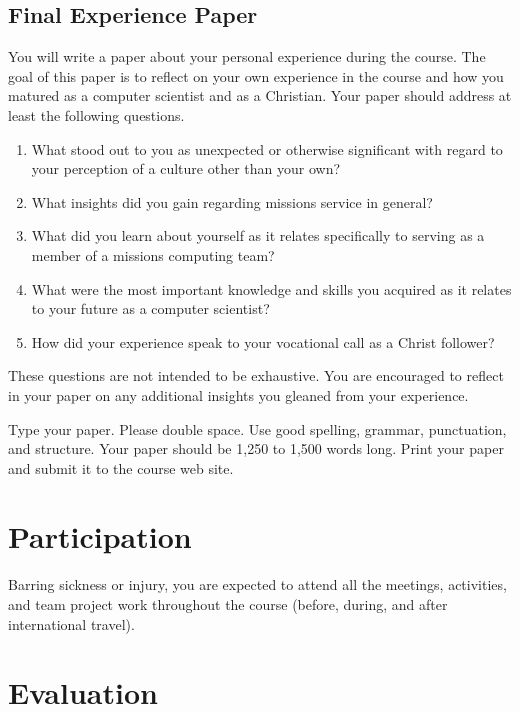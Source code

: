 \documentclass[11pt]{article}
\begin{document}
\subsection{Final Experience Paper}

You will write a paper about your personal experience during the course.
The goal of this paper is to reflect on your own experience in the course
and how you matured as a computer scientist and as a Christian.
Your paper should address at least the following questions.
\begin{enumerate}
\item
  What stood out to you as unexpected or otherwise significant
  with regard to your perception of a culture other than your own?
\item
  What insights did you gain regarding missions service in general?
\item
  What did you learn about yourself
  as it relates specifically to serving as a member of a missions computing team?
\item
  What were the most important knowledge and skills you acquired
  as it relates to your future as a computer scientist?
\item
  How did your experience speak to your vocational call as a Christ follower?
\end{enumerate}
These questions are not intended to be exhaustive.
You are encouraged to reflect in your paper
on any additional insights you gleaned from your experience.

Type your paper.
Please double space.
Use good spelling, grammar, punctuation, and structure.
Your paper should be 1,250 to 1,500 words long.
Print your paper and submit it to the course web site.

\section{Participation}

Barring sickness or injury, you are expected
to attend all the meetings, activities, and team project work
throughout the course
(before, during, and after international travel).

\section{Evaluation}
\end{document}
